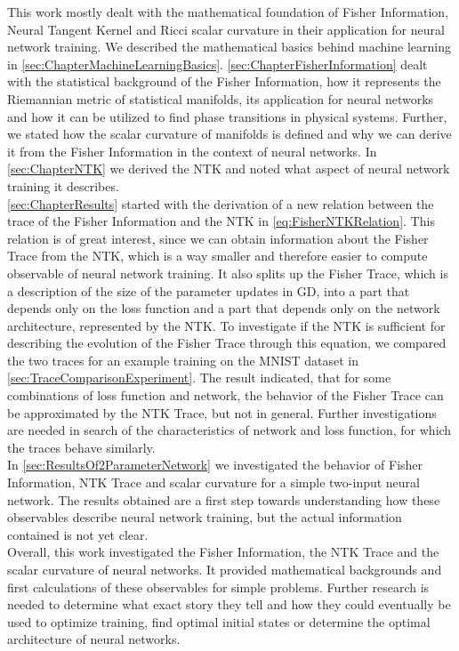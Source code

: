 This work mostly dealt with the mathematical foundation of Fisher Information, Neural Tangent Kernel and Ricci scalar curvature in their application for neural network training. We described the mathematical basics behind machine learning in \cref{sec:ChapterMachineLearningBasics}. \cref{sec:ChapterFisherInformation} dealt with the statistical background of the Fisher Information, how it represents the Riemannian metric of statistical manifolds, its application for neural networks and how it can be utilized to find phase transitions in physical systems. Further, we stated how the scalar curvature of manifolds is defined and why we can derive it from the Fisher Information in the context of neural networks. In \cref{sec:ChapterNTK} we derived the NTK and noted what aspect of neural network training it describes.\\
\cref{sec:ChapterResults} started with the derivation of a new relation between the trace of the Fisher Information and the NTK in \cref{eq:FisherNTKRelation}. This relation is of great interest, since we can obtain information about the Fisher Trace from the NTK, which is a way smaller and therefore easier to compute observable of neural network training. It also splits up the Fisher Trace, which is a description of the size of the parameter updates in GD, into a part that depends only on the loss function and a part that depends only on the network architecture, represented by the NTK. To investigate if the NTK is sufficient for describing the evolution of the Fisher Trace through this equation, we compared the two traces for an example training on the MNIST dataset in \cref{sec:TraceComparisonExperiment}. The result indicated, that for some combinations of loss function and network, the behavior of the Fisher Trace can be approximated by the NTK Trace, but not in general. Further investigations are needed in search of the characteristics of network and loss function, for which the traces behave similarly.\\
In \cref{sec:ResultsOf2ParameterNetwork} we investigated the behavior of Fisher Information, NTK Trace and scalar curvature for a simple two-input neural network. The results obtained are a first step towards understanding how these observables describe neural network training, but the actual information contained is not yet clear.\\
Overall, this work investigated the Fisher Information, the NTK Trace and the scalar curvature of neural networks. It provided mathematical backgrounds and first calculations of these observables for simple problems. Further research is needed to determine what exact story they tell and how they could eventually be used to optimize training, find optimal initial states or determine the optimal architecture of neural networks.
